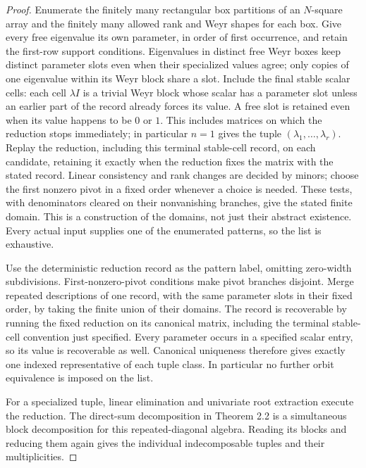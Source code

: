 \begin{proof}
Enumerate the finitely many rectangular box partitions of an $N$-square
array and the finitely many allowed rank and Weyr shapes for each box.
Give every free eigenvalue its own parameter, in order of first occurrence,
and retain the first-row support conditions. Eigenvalues in distinct free
Weyr boxes keep distinct parameter slots even when their specialized values
agree; only copies of one eigenvalue within its Weyr block share a slot.
Include the final stable
scalar cells: each cell $\lambda I$ is a trivial Weyr block whose scalar
has a parameter slot unless an earlier part of the record already
forces its value. A free slot is retained even when its value happens
to be $0$ or $1$. This includes matrices on which the reduction stops
immediately; in particular $n=1$ gives the tuple
$(\lambda_1,\ldots,\lambda_r)$.
Replay the reduction, including this terminal stable-cell record, on each
candidate, retaining it exactly when the reduction fixes the matrix with
the stated record. Linear consistency and rank changes are decided by minors;
choose the first nonzero pivot in a fixed order whenever a choice is needed.
These tests, with denominators cleared on their nonvanishing branches,
give the stated finite domain. This is a construction of the domains,
not just their abstract existence. Every actual input supplies one of the
enumerated patterns, so the list is exhaustive.

Use the deterministic reduction record as the pattern label, omitting
zero-width subdivisions. First-nonzero-pivot conditions make pivot branches
disjoint. Merge repeated descriptions of one record, with the same parameter
slots in their fixed order, by taking the finite union of their domains.
The record is recoverable by running the fixed reduction on its canonical
matrix, including the terminal stable-cell convention just specified.
Every parameter occurs in a specified scalar entry, so its value is
recoverable as well. Canonical uniqueness therefore gives exactly one
indexed representative of each tuple class. In particular no further
orbit equivalence is imposed on the list.

For a specialized tuple, linear elimination and univariate root extraction
execute the reduction. The direct-sum decomposition in Theorem 2.2 is a
simultaneous block decomposition for this repeated-diagonal algebra.
Reading its blocks and reducing them again gives the individual
indecomposable tuples and their multiplicities.
\end{proof}

